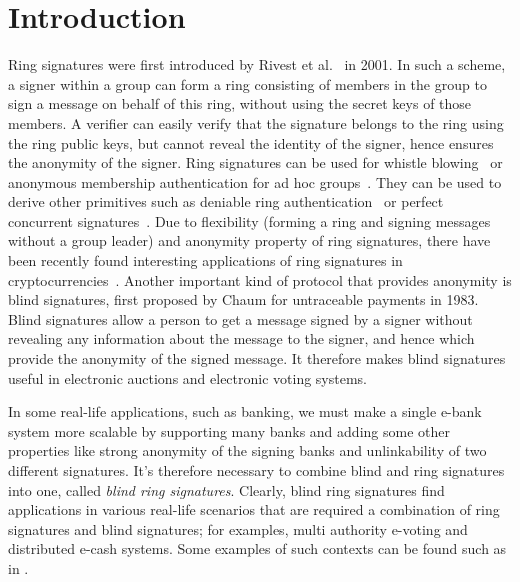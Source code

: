 \documentclass[runningheads]{llncs}
\begin{document}
\section{Introduction}
Ring signatures were first introduced by Rivest et al.~\cite{RST01} in 2001. In such a scheme, a signer within a group can form a ring consisting of members in the group to sign a message on behalf of this ring, without using the secret keys of those members. A verifier can easily verify that the signature belongs to the ring using the ring public keys, but cannot reveal the identity of the signer, hence ensures the anonymity of the signer. Ring signatures can be used for whistle blowing~\cite{RST01} or anonymous membership authentication for ad hoc groups~\cite{BSS02}. They can be used to derive other primitives such as deniable ring authentication~\cite{SM03} or perfect concurrent signatures~\cite{SMZ04}. Due to flexibility (forming a ring and signing messages without a group leader) and anonymity property of ring signatures, there have been recently found interesting applications of ring signatures in cryptocurrencies~\cite{CryptoNote}.   Another important kind of protocol that provides anonymity is blind signatures, first proposed by Chaum \cite{Chau83} for untraceable payments in 1983. Blind signatures allow a person to get a message signed by a signer  without revealing any information about the message to the signer, and hence which provide the anonymity of the signed message. It therefore makes blind signatures useful in electronic auctions and electronic voting systems. 

In some real-life applications, such as banking, we must make a single e-bank system more scalable by supporting many banks and adding some other properties like strong anonymity of the signing banks and unlinkability of two different signatures. It's therefore necessary to combine blind and ring signatures into one, called \textit{blind ring signatures}. Clearly, blind ring signatures find applications in various real-life scenarios that are required a combination of ring signatures and blind signatures; for examples, multi authority e-voting and distributed e-cash systems. Some examples of such contexts can be found such as in \cite{HL06, WZSM06, GS13}.

\end{document}
